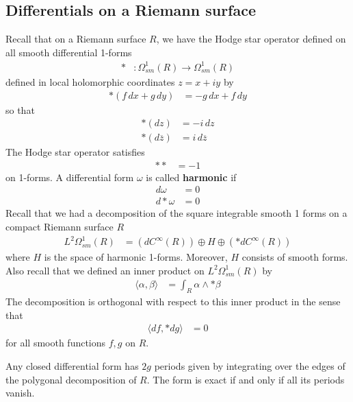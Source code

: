 \documentclass[12pt]{article}
\begin{document}
\subsection{Differentials on a Riemann surface}
Recall that on a Riemann surface $R$, we have the Hodge star operator defined on all smooth differential 1-forms \begin{align*}
    * & : \Omega^1_{sm}(R) \to \Omega^1_{sm}(R)
\end{align*} defined in local holomorphic coordinates $z = x + iy$ by \begin{align*}
    *(f\,dx + g\,dy) & = -g\,dx + f\,dy
\end{align*} so that \begin{align*}
    *(dz) & = -i\, dz \\
    *(d\overline{z}) & = i\, d\overline{z}
\end{align*} The Hodge star operator satisfies \begin{align*}
    ** & = -1
\end{align*} on 1-forms. A differential form $\omega$ is called \textbf{harmonic} if \begin{align*}
    d\omega & = 0 \\
    d * \omega & = 0
\end{align*}
Recall that we had a decomposition of the square integrable smooth 1 forms on a compact Riemann surface $R$ \begin{align*}
    L^2 \Omega^1_{sm}(R) & = (dC^{\infty}(R)) \oplus H \oplus (*d C^{\infty}(R))
\end{align*} where $H$ is the space of harmonic 1-forms. Moreover, $H$ consists of smooth forms. Also recall that we defined an inner product on $L^2 \Omega^1_{sm}(R)$ by \begin{align*}
    \langle\alpha, \beta\rangle & = \int_R \alpha \wedge * \beta
\end{align*} The decomposition is orthogonal with respect to this inner product in the sense that \begin{align*}
    \langle d f, * d g\rangle & = 0
\end{align*} for all smooth functions $f,g$ on $R$.

Any closed differential form has $2g$ periods given by integrating over the edges of the polygonal decomposition of $R$. The form is exact if and only if all its periods vanish. 
\end{document}
